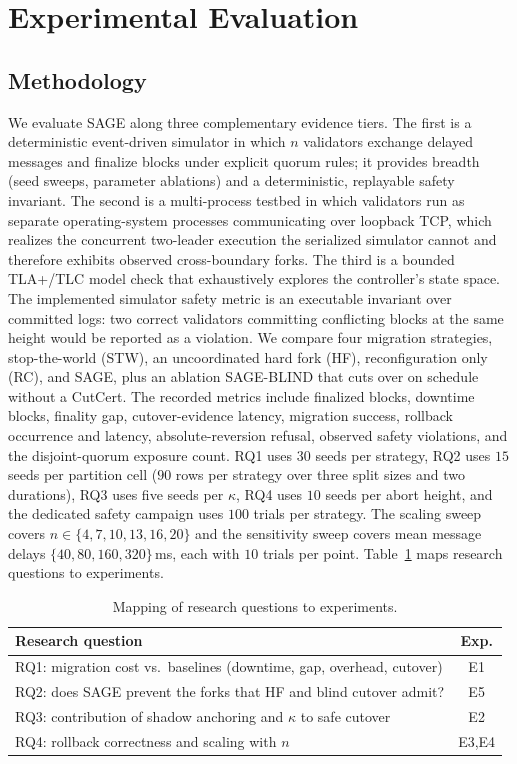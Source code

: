 \documentclass[journal]{IEEEtran}
\begin{document}
\section{Experimental Evaluation}
\label{sec:eval}

\subsection{Methodology}
We evaluate SAGE along three complementary evidence tiers. The first is a
deterministic event-driven simulator in which $n$ validators exchange delayed messages and
finalize blocks under explicit quorum rules; it provides breadth (seed sweeps, parameter
ablations) and a deterministic, replayable safety invariant. The second is a multi-process
testbed in which validators run as separate operating-system processes communicating over
loopback TCP, which realizes the concurrent two-leader execution the serialized simulator cannot
and therefore exhibits observed cross-boundary forks. The third is a bounded TLA+/TLC model check
that exhaustively explores the controller's state space. The implemented simulator safety metric
is an executable invariant over committed logs: two correct validators committing conflicting
blocks at the same height would be reported as a violation. We compare
four migration strategies, stop-the-world (STW), an uncoordinated hard fork (HF),
reconfiguration only (RC), and SAGE, plus an ablation SAGE-BLIND that cuts over on schedule
without a CutCert. The recorded metrics include finalized blocks, downtime blocks,
finality gap, cutover-evidence latency, migration success, rollback occurrence and latency,
absolute-reversion refusal, observed safety violations, and the disjoint-quorum exposure count.
RQ1 uses $30$ seeds per strategy, RQ2 uses $15$ seeds per partition cell ($90$ rows per strategy
over three split sizes and two durations), RQ3 uses five seeds per $\kappa$, RQ4 uses $10$ seeds
per abort height, and the dedicated safety campaign uses $100$ trials per strategy. The scaling
sweep covers $n\in\{4,7,10,13,16,20\}$ and the sensitivity sweep covers mean message delays
$\{40,80,160,320\}\,$ms, each with $10$ trials per point. Table~\ref{tab:rqmap} maps research
questions to experiments.

\begin{table}[t]
\centering
\caption{Mapping of research questions to experiments.}
\label{tab:rqmap}
\renewcommand{\arraystretch}{1.12}
\footnotesize
\begin{tabular}{p{}c}
\toprule
Research question & Exp. \\
\midrule
RQ1: migration cost vs.\ baselines (downtime, gap, overhead, cutover) & E1 \\
RQ2: does SAGE prevent the forks that HF and blind cutover admit? & E5 \\
RQ3: contribution of shadow anchoring and $\kappa$ to safe cutover & E2 \\
RQ4: rollback correctness and scaling with $n$ & E3,E4 \\
\bottomrule
\end{tabular}
\end{table}
\end{document}
